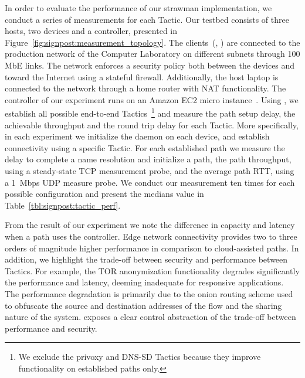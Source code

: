 In order to evaluate the performance of our strawman implementation, we conduct
a series of measurements for each Tactic.  Our testbed
consists of three hosts, two \signpost devices and a \signpost controller,
presented in Figure~\ref{fig:signpost:measurement_topology}. The \signpost
clients~(, ) are connected to the production
network of the Computer Laboratory on different subnets through 100 MbE links.
The network enforces a security policy both between the devices and toward the
Internet using a stateful firewall.  Additionally, the host laptop is connected
to the network through a home router with NAT functionality. The \signpost
controller of our experiment runs on an Amazon EC2 micro
instance~. Using \signpost, we establish all possible
end-to-end Tactics~\footnote{We exclude the privoxy and DNS-SD Tactics because
  they improve functionality on established paths only.} and measure the path
setup delay, the achievable throughput and the round trip delay for each Tactic.
More specifically, in each experiment we initialize the
\signpost daemon on each device, and establish connectivity using a specific
Tactic. For each established path we measure the delay to complete a \signpost
name resolution and initialize a \signpost path, the path throughput,
using a steady-state TCP measurement probe, and the average path RTT,
using a 1~Mbps UDP measure probe. We conduct our measurement ten times for each
possible configuration and present the medians value in
Table~\ref{tbl:signpost:tactic_perf}. 

From the result of our experiment we note the difference in capacity and latency
when a path uses the \signpost controller. Edge network connectivity provides
two to three orders of magnitude higher performance in comparison to
cloud-assisted paths.  In addition, we highlight the trade-off between security
and performance between Tactics. For example, the TOR anonymization
functionality degrades significantly the performance and latency, deeming
inadequate for responsive applications. The performance degradation is primarily
due to the onion routing scheme used to obfuscate the source and destination
addresses of the flow and the sharing nature of the system.  \signpost exposes a
clear control abstraction of the trade-off between performance and security. 


